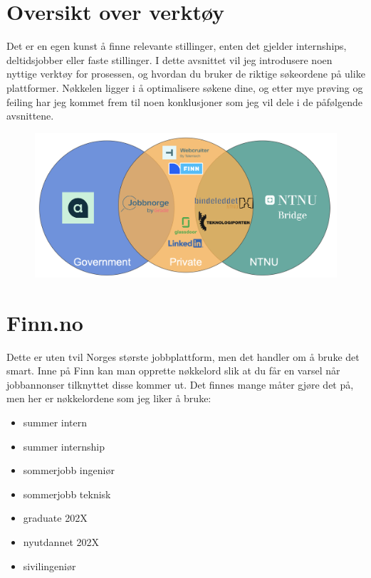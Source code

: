\section{Oversikt over verktøy}

Det er en egen kunst å finne relevante stillinger, enten det gjelder internships, deltidsjobber eller faste stillinger. I dette avsnittet vil jeg introdusere noen nyttige verktøy for prosessen, og hvordan du bruker de riktige søkeordene på ulike plattformer. Nøkkelen ligger i å optimalisere søkene dine, og etter mye prøving og feiling har jeg kommet frem til noen konklusjoner som jeg vil dele i de påfølgende avsnittene.

\begin{figure}[H]
    \centering
    \includegraphics[width=0.8\linewidth]{images/Venn-diagram.png}
\end{figure}



\section{Finn.no}

Dette er uten tvil Norges største jobbplattform, men det handler om å bruke det smart. Inne på Finn kan man opprette nøkkelord slik at du får en varsel når jobbannonser tilknyttet disse kommer ut. Det finnes mange måter gjøre det på, men her er nøkkelordene som jeg liker å bruke:

\begin{itemize}
    \item summer intern 
    \item summer internship
    \item sommerjobb ingeniør 
    \item sommerjobb teknisk
\end{itemize}

\begin{itemize}
    \item graduate 202X
    \item nyutdannet 202X
    \item sivilingeniør
\end{itemize}

